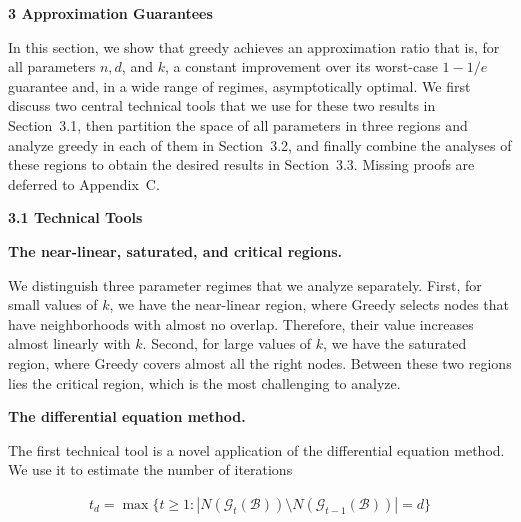 \documentclass[10pt,a4paper]{article}
\begin{document}
\par\medskip\noindent\textbf{3 Approximation Guarantees}\par




In this section, we show that greedy achieves an approximation ratio that is, for all parameters $n,d$, and $k$, a constant improvement over its worst-case $1-1/e$ guarantee and, in a wide range of regimes, asymptotically optimal. We first discuss two central technical tools that we use for these two results in Section 3.1, then partition the space of all parameters in three regions and analyze greedy in each of them in Section 3.2, and finally combine the analyses of these regions to obtain the desired results in Section 3.3. Missing proofs are deferred to Appendix C.\par




\par\medskip\noindent\textbf{3.1 Technical Tools}\par




\par\medskip\noindent\textbf{The near-linear, saturated, and critical regions.}\par




We distinguish three parameter regimes that we analyze separately.
First, for small values of $k$, we have the near-linear region, where Greedy selects nodes that have neighborhoods with almost no overlap. Therefore, their value increases almost linearly with $k$.
Second, for large values of $k$, we have the saturated region, where Greedy covers almost all the right nodes.
Between these two regions lies the critical region, which is the most challenging to analyze.\par





\par\medskip\noindent\textbf{The differential equation method.}\par




The first technical tool is a novel application of the differential equation method. We use it to estimate the number of iterations\par


\[\begin{gathered}
t_{d}=\max\{t\geq 1:|N(\mathcal{G}_{t}(\mathcal{B}))\setminus N(\mathcal{G}_{t-1}(\mathcal{B}))|=d\}
\end{gathered}\]
\end{document}
